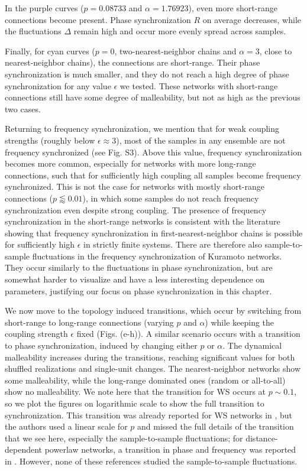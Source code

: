 In the purple curves ($p = 0.08733$ and $\alpha=1.76923$), even more short-range connections become present. Phase synchronization $R$ on average decreases, while the fluctuations $\Delta$ remain high and occur more evenly spread across samples.

Finally, for cyan curves ($p = 0$, two-nearest-neighbor chains and $\alpha = 3$, close to nearest-neighbor chains), the connections are short-range. Their phase synchronization is much smaller, and they do not reach a high degree of phase synchronization for any value $\epsilon$ we tested.
These networks with short-range connections still have some degree of malleability, but not as high as the previous two cases. 

Returning to frequency synchronization, we mention that for weak coupling strengths (roughly below $\epsilon \approx 3$), most of the samples in any ensemble are not frequency synchronized (see Fig. S3). Above this value, frequency synchronization becomes more common, especially for networks with more long-range connections, such that for sufficiently high coupling all samples become frequency synchronized. This is not the case for networks with mostly short-range connections ($p \lessapprox 0.01$), in which some samples do not reach frequency synchronization even despite strong coupling. The presence of frequency synchronization in the short-range networks is consistent with the literature \cite{strogatz1988phase, acebron2005kuramoto} showing that frequency synchronization in first-nearest-neighbor chains is possible for sufficiently high $\epsilon$ in strictly finite systems. There are therefore also sample-to-sample fluctuations in the frequency synchronization of Kuramoto networks. They occur similarly to the fluctuations in phase synchronization, but are somewhat harder to visualize and have a less interesting dependence on parameters, justifying our focus on phase synchronization in this chapter.

We now move to the topology induced transitions, which occur by switching from short-range to long-range connections (varying $p$ and $\alpha$) while keeping the coupling strength $\epsilon$ fixed (Figs. (e-h)). A similar scenario occurs with a transition to phase synchronization, induced by changing either $p$ or $\alpha$. The dynamical malleability increases during the transitions, reaching significant values for both shuffled realizations and single-unit changes. The nearest-neighbor networks show some malleability, while the long-range dominated ones (random or all-to-all) show no malleability. We note here that the transition for WS occurs at $p \sim 0.1$, so we plot the figures on logarithmic scale to show the full transition to synchronization. This transition was already reported for WS networks in \cite{hong2002synchronization}, but the authors used a linear scale for $p$ and missed the full details of the transition that we see here, especially the sample-to-sample fluctuations; for distance-dependent powerlaw networks, a transition in phase and frequency was reported in \cite{rogers1996phasetransitions}. However, none of these references studied the sample-to-sample fluctuations.

